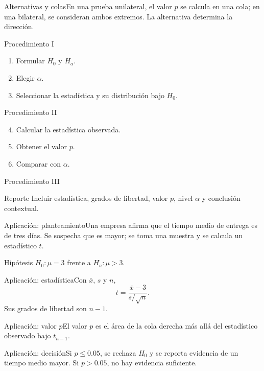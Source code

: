 \documentclass[10pt,aspectratio=169]{beamer}
\begin{document}
\begin{frame}{Alternativas y colas}\small En una prueba unilateral, el valor $p$ se calcula en una cola; en una bilateral, se consideran ambos extremos. La alternativa determina la dirección.\end{frame}
\begin{frame}{Procedimiento I}\small\begin{enumerate}\item Formular $H_0$ y $H_a$.\item Elegir $\alpha$.\item Seleccionar la estadística y su distribución bajo $H_0$.\end{enumerate}\end{frame}
\begin{frame}{Procedimiento II}\small\begin{enumerate}\setcounter{enumi}{3}\item Calcular la estadística observada.\item Obtener el valor $p$.\item Comparar con $\alpha$.\end{enumerate}\end{frame}
\begin{frame}{Procedimiento III}\small\begin{block}{Reporte} Incluir estadística, grados de libertad, valor $p$, nivel $\alpha$ y conclusión contextual.\end{block}\end{frame}
\begin{frame}{Aplicación: planteamiento}\small Una empresa afirma que el tiempo medio de entrega es de tres días. Se sospecha que es mayor; se toma una muestra y se calcula un estadístico $t$.\begin{block}{Hipótesis} $H_0:\mu=3$ frente a $H_a:\mu>3$.\end{block}\end{frame}
\begin{frame}{Aplicación: estadística}\small Con $\bar x$, $s$ y $n$,\[t=\frac{\bar x-3}{s/\sqrt n}.\]Sus grados de libertad son $n-1$.\end{frame}
\begin{frame}{Aplicación: valor $p$}\small El valor $p$ es el área de la cola derecha más allá del estadístico observado bajo $t_{n-1}$.\end{frame}
\begin{frame}{Aplicación: decisión}\small Si $p\leq0.05$, se rechaza $H_0$ y se reporta evidencia de un tiempo medio mayor. Si $p>0.05$, no hay evidencia suficiente.\end{frame}
\end{document}
